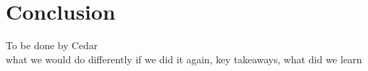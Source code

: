 \section{Conclusion}
To be done by Cedar \\
what we would do differently if we did it again, key takeaways, what did we learn
